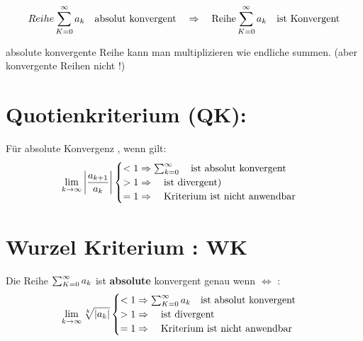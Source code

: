 \begin{theorem}
$$ Reihe \sum_{K=0}^{\infty} a_k \quad \text{absolut konvergent} \quad \Rightarrow \quad \text{Reihe} \sum_{K=0}^{\infty} a_k \quad \text{ist Konvergent} $$	
\end{theorem}

\begin{remark}	
absolute konvergente Reihe kann man multiplizieren wie endliche summen. (aber konvergente Reihen nicht !)
\end{remark}

\section{Quotienkriterium (QK):}
Für absolute  Konvergenz , wenn gilt:\\

\begin{align*}
\lim\limits_{k \rightarrow \infty} \bigg|\frac{a_{k+1}}{a_k} \bigg|
\begin{cases}
< 1 \Rightarrow  \sum_{k=0}^{\infty} \quad \text{ist absolut konvergent}\\
> 1 \Rightarrow \quad \text{ist divergent)}\\
= 1 \Rightarrow \quad \text{Kriterium ist nicht anwendbar} 
\end{cases}
\end{align*}

\section{Wurzel Kriterium : WK }
Die Reihe $\sum_{K=0}^{\infty} a_k$ ist  \textbf{absolute} konvergent genau wenn $\Leftrightarrow$ :
\begin{align*}
\lim\limits_{k \rightarrow \infty} \sqrt[k]{|a_k|}
\begin{cases}
< 1 \Rightarrow \sum_{K=0}^{\infty} a_k \quad \text{ist absolut konvergent}\\
> 1 \Rightarrow \quad \text{ist divergent}\\
= 1 \Rightarrow \quad \text{Kriterium ist nicht anwendbar} 
\end{cases}
\end{align*}

